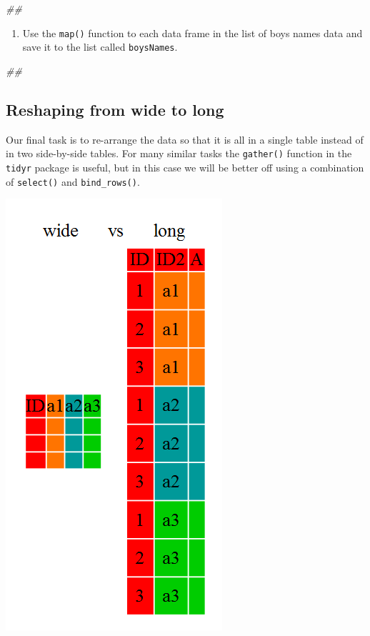 \documentclass[]{book}
\newenvironment{Shaded}{\begin{snugshade}}{\end{snugshade}}
\newcommand{\CommentTok}[1]{\textcolor[rgb]{0.56,0.35,0.01}{\textit{#1}}}
\providecommand{\tightlist}{%
  \setlength{\itemsep}{0pt}\setlength{\parskip}{0pt}}
\begin{document}
\begin{Shaded}
\begin{Highlighting}[]
\CommentTok{## }
\end{Highlighting}
\end{Shaded}

\begin{enumerate}
\def\labelenumi{\arabic{enumi}.}
\setcounter{enumi}{2}
\tightlist
\item
  Use the \texttt{map()} function to each data frame in the list of boys
  names data and save it to the list called \texttt{boysNames}.
\end{enumerate}

\begin{Shaded}
\begin{Highlighting}[]
\CommentTok{## }
\end{Highlighting}
\end{Shaded}

\hypertarget{reshaping-from-wide-to-long}{%
\subsection{Reshaping from wide to long}\label{reshaping-from-wide-to-long}}

Our final task is to re-arrange the data so that it is all in a single
table instead of in two side-by-side tables. For many similar tasks
the \texttt{gather()} function in the \texttt{tidyr} package is useful, but in this
case we will be better off using a combination of \texttt{select()} and
\texttt{bind\_rows()}.

\includegraphics{R/RDataWrangling/images/wide_vs_long.png}
\end{document}
